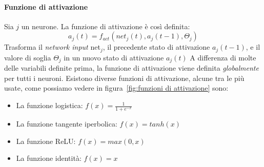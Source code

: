 \documentclass[12pt, twoside, letterpaper]{report}
\begin{document}
			 \paragraph{Funzione di attivazione} Sia $j$ un neurone. La funzione di attivazione è così definita: $$a_j(t) = f_{act}(net_j(t),a_j(t-1), \Theta_j)$$ %
			 	Trasforma il \textit{network input} net$_j$, il precedente stato di attivazione $a_j(t-1)$, e il valore di soglia $\Theta_j$ in un nuovo stato di attivazione $a_j(t)$ %
			 	A differenza di molte delle variabili definite prima, la funzione di attivazione viene definita \textit{globalmente} per tutti i neuroni. Esistono diverse funzioni di attivazione, alcune tra le più usate, come possiamo vedere in figura~\ref{fig:funzioni di attivazione} sono: 
			 	\begin{itemize}
			 		\item La funzione logistica: $f(x) = \frac{1}{1+e^{-x}}$
			 		\item La funzione tangente iperbolica: $f(x) = tanh(x)$
			 		\item La funzione ReLU: $f(x) = max(0,x)$ %
			 		\item La funzione identità: $f(x) = x$
			 	\end{itemize}
\end{document}
